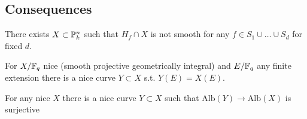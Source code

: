 \documentclass[12pt]{article}
\begin{document}
\subsection{Consequences}

\begin{thm}
There exists $X \subset \P^n_k$ such that $H_f \cap X$ is not smooth for any $f \in S_1 \cup \dots \cup S_d$ for fixed $d$. 
\end{thm}

\begin{thm}
For $X / \FF_q$ nice (smooth projective geometrically integral) and $E / \FF_q$ any finite extension there is a nice curve $Y \subset X$ s.t. $Y(E) = X(E)$. 
\end{thm}
 
\begin{thm}
For any nice $X$ there is a nice curve $Y \subset X$ such that $\mathrm{Alb}(Y) \to \mathrm{Alb}(X)$ is surjective
\end{thm}
\end{document}
